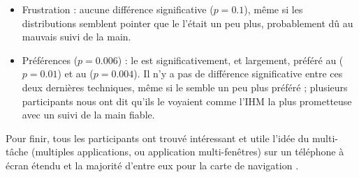 \begin{itemize}
  \item Frustration : aucune différence significative ($p = \num{0.1}$), même si les distributions semblent pointer que le  l'était un peu plus, probablement dû au mauvais suivi de la main.
  \item Préférences ($p = \num{0.006}$) : le  est significativement, et largement, préféré au  ($p = \num{0.01}$) et au  ($p = \num{0.004}$). Il n'y a pas de différence significative entre ces deux dernières techniques, même si le  semble un peu plus préféré ; plusieurs participants nous ont dit qu'ils le voyaient comme l'IHM la plus prometteuse avec un suivi de la main fiable.
\end{itemize}

Pour finir, tous les participants ont trouvé intéressant et utile l'idée du multi-tâche (multiples applications, ou application multi-fenêtres) sur un téléphone à écran étendu  et la majorité d'entre eux pour la carte de navigation .